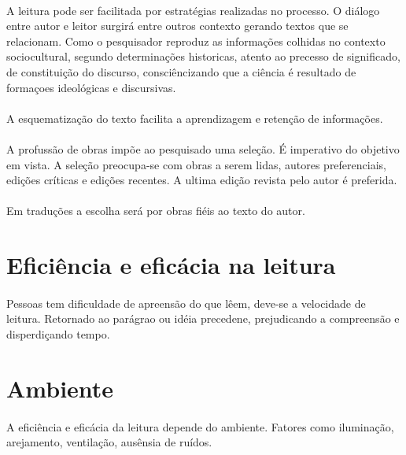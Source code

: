 \paragraph{}
A leitura pode ser facilitada por estratégias realizadas no processo. O diálogo entre autor e leitor surgirá entre outros contexto gerando textos que se relacionam. Como o pesquisador reproduz as informações colhidas no contexto sociocultural, segundo determinações historicas, atento ao precesso de significado, de constituição do discurso, consciêncizando que a ciência é resultado de formaçoes ideológicas e discursivas.

\paragraph{}
A esquematização do texto facilita a aprendizagem e retenção de informações.

\paragraph{}
A profussão de obras impõe ao pesquisado uma seleção. É imperativo do objetivo em vista. A seleção preocupa-se com obras a serem lidas, autores preferenciais, edições críticas e edições recentes.
A ultima edição revista pelo autor é preferida.
\paragraph{}
Em traduções a escolha será por obras fiéis ao texto do autor.

\section{Eficiência e eficácia na leitura}

\paragraph{}
Pessoas tem dificuldade de apreensão do que lêem, deve-se a velocidade de leitura. Retornado ao parágrao ou idéia precedene, prejudicando a compreensão e disperdiçando tempo.

\section{Ambiente}

\paragraph{}
A eficiência e eficácia da leitura depende do ambiente. Fatores como iluminação, arejamento, ventilação, ausênsia de ruídos.

